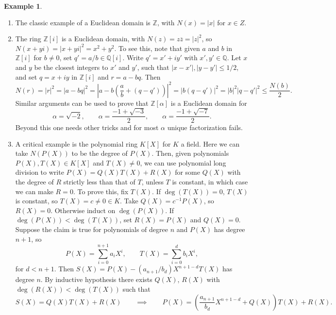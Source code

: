 \documentclass{article}
\newcommand{\Z}{\mathbb{Z}}
\newcommand{\Q}{\mathbb{Q}}
\newcommand{\rb}[1]{\left( #1 \right)}
\renewcommand{\sb}[1]{\left[ #1 \right]}
\newcommand{\abs}[1]{\left\lvert #1 \right\rvert}
\theoremstyle{definition}\newtheorem{definition}{Definition}[subsection]
\theoremstyle{definition}\newtheorem{remark}[definition]{Remark}
\theoremstyle{definition}\newtheorem*{example}{Example}
\theoremstyle{definition}\newtheorem*{note}{Note}
\begin{document}
\begin{example}
\hfill
\begin{enumerate}
\item The classic example of a Euclidean domain is $ \Z $, with $ N\rb{x} = \abs{x} $ for $ x \in Z $.
\item The ring $ \Z\sb{i} $ is a Euclidean domain, with $ N\rb{z} = z\overline{z} = \abs{z}^2 $, so $ N\rb{x + yi} = \abs{x + yi}^2 = x^2 + y^2 $. To see this, note that given $ a $ and $ b $ in $ \Z\sb{i} $ for $ b \ne 0 $, set $ q' = a / b \in \Q\sb{i} $. Write $ q' = x' + iy' $ with $ x', y' \in \Q $. Let $ x $ and $ y $ be the closest integers to $ x' $ and $ y' $, such that $ \abs{x - x'}, \abs{y - y'} \le 1 / 2 $, and set $ q = x + iy $ in $ \Z\sb{i} $ and $ r = a - bq $. Then
$$ N\rb{r} = \abs{r}^2 = \abs{a - bq}^2 = \abs{a - b\rb{\dfrac{a}{b} + \rb{q - q'}}}^2 = \abs{b\rb{q - q'}}^2 = \abs{b}^2\abs{q - q'}^2 \le \dfrac{N\rb{b}}{2}. $$
Similar arguments can be used to prove that $ \Z\sb{\alpha} $ is a Euclidean domain for
$$ \alpha = \sqrt{-2}, \qquad \alpha = \dfrac{-1 + \sqrt{-3}}{2}, \qquad \alpha = \dfrac{-1 + \sqrt{-7}}{2}. $$
Beyond this one needs other tricks and for most $ \alpha $ unique factorization fails.
\item A critical example is the polynomial ring $ K\sb{X} $ for $ K $ a field. Here we can take $ N\rb{P\rb{X}} $ to be the degree of $ P\rb{X} $. Then, given polynomials $ P\rb{X}, T\rb{X} \in K\sb{X} $ and $ T\rb{X} \ne 0 $, we can use polynomial long division to write $ P\rb{X} = Q\rb{X}T\rb{X} + R\rb{X} $ for some $ Q\rb{X} $ with the degree of $ R $ strictly less than that of $ T $, unless $ T $ is constant, in which case we can make $ R = 0 $. To prove this, fix $ T\rb{X} $. If $ \deg\rb{T\rb{X}} = 0 $, $ T\rb{X} $ is constant, so $ T\rb{X} = c \ne 0 \in K $. Take $ Q\rb{X} = c^{-1}P\rb{X} $, so $ R\rb{X} = 0 $. Otherwise induct on $ \deg\rb{P\rb{X}} $. If $ \deg\rb{P\rb{X}} < \deg\rb{T\rb{X}} $, set $ R\rb{X} = P\rb{X} $ and $ Q\rb{X} = 0 $. Suppose the claim is true for polynomials of degree $ n $ and $ P\rb{X} $ has degree $ n + 1 $, so
$$ P\rb{X} = \sum_{i = 0}^{n + 1} a_iX^i, \qquad T\rb{X} = \sum_{i = 0}^d b_iX^i, $$
for $ d < n + 1 $. Then $ S\rb{X} = P\rb{X} - \rb{a_{n + 1} / b_d}X^{n + 1 - d}T\rb{X} $ has degree $ n $. By inductive hypothesis there exists $ Q\rb{X} $, $ R\rb{X} $ with $ \deg\rb{R\rb{X}} < \deg\rb{T\rb{X}} $ such that
$$ S\rb{X} = Q\rb{X}T\rb{X} + R\rb{X} \qquad \implies \qquad P\rb{X} = \rb{\dfrac{a_{n + 1}}{b_d}X^{n + 1 - d} + Q\rb{X}}T\rb{X} + R\rb{X}. $$
\end{enumerate}
\end{example}
\end{document}
